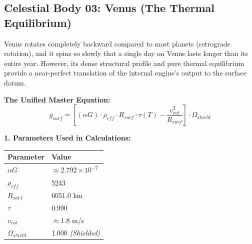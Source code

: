 \documentclass[11pt, a4paper]{article}
\begin{document}
\clearpage
\subsection{Celestial Body 03: Venus (The Thermal Equilibrium)}
  Venus rotates completely backward compared to most planets (retrograde rotation), and it spins so slowly that a single day on Venus lasts longer than its entire year. However, its dense structural profile and pure thermal equilibrium provide a near-perfect translation of the internal engine's output to the surface datum.

  \vspace{0.5em}
  \noindent \textbf{The Unified Master Equation:}
  $$ g_{surf} = \left[ (\alpha G) \cdot \rho_{eff} \cdot R_{surf} \cdot \tau(T) - \frac{v_{rot}^2}{R_{surf}} \right] \cdot \Omega_{shield} $$

  \vspace{0.5em}
  \noindent \textbf{1. Parameters Used in Calculations:} \\[0.5em]
  \begingroup
  \renewcommand{\arraystretch}{1.3}
  \hspace*{2em}
  \begin{tabular}{|l|l|}
    \hline
    \textbf{Parameter} & \textbf{Value} \\ \hline
    $\alpha G$ & $\approx 2.792 \times 10^{-7}$ \\ \hline
    $\rho_{eff}$ & 5243 \\ \hline
    $R_{surf}$ & 6051.0 km \\ \hline
    $\tau$ & 0.990 \\ \hline
    $v_{rot}$ & $\approx 1.8$ m/s \\ \hline
    $\Omega_{shield}$ & 1.000 \textit{(Shielded)} \\ \hline
  \end{tabular}
  \endgroup
\end{document}
